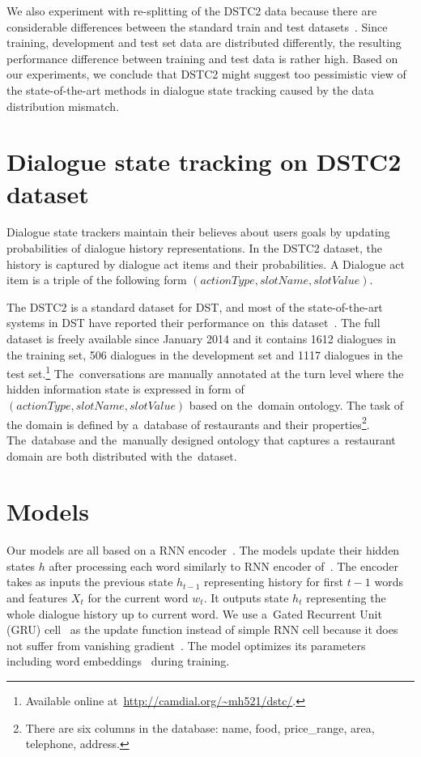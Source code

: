 \documentclass{itatnew}
\begin{document}
We also experiment with re-splitting of the DSTC2 data because there are considerable differences between the standard train and test datasets~\cite{henderson2014second}.
Since training, development and test set data are distributed differently, the resulting performance difference between training and test data is rather high.
Based on our experiments, we conclude that DSTC2 might suggest too pessimistic view of the state-of-the-art methods in dialogue state tracking caused by the data distribution mismatch.


\section{Dialogue state tracking on DSTC2 dataset}\label{sec:dst}
Dialogue state trackers maintain their believes about users goals by updating probabilities of dialogue history representations.
In the DSTC2 dataset, the history is captured by dialogue act items and their probabilities.
A Dialogue act item is a triple of the following form $(actionType, slotName, slotValue)$.

The DSTC2 is a standard dataset for DST, and most of the state-of-the-art systems in DST have reported their performance on~this dataset~\cite{henderson2014second}. 
The full dataset is freely available since January 2014 and it contains 1612 dialogues in the training set, 506 dialogues in the development set and 1117 dialogues in the test set.\footnote{Available online at~\url{http://camdial.org/~mh521/dstc/}.}
The~conversations are manually annotated at the turn level where the hidden information state is expressed in form of $(actionType, slotName, slotValue)$ based on the~domain ontology.
The task of the domain is defined by a~database of restaurants and their properties\footnote{There are six columns in the database: name, food, price\_range, area, telephone, address.}.
The~database and the~manually designed ontology that captures a~restaurant domain are both distributed with the~dataset.

\section{Models}\label{sec:model}
Our models are all based on a RNN encoder~\cite{werbos1990backpropagation}. 
The models update their hidden states $h$ after processing each word similarly to RNN encoder of~\citet{zilka2015incremental}.
The encoder takes as inputs the previous state $h_{t-1}$ representing history for first $t-1$ words and features $X_t$ for the current word $w_t$. 
It outputs state $h_t$ representing the whole dialogue history up to current word.
We use a~Gated Recurrent Unit (GRU) cell~\cite{cho2014gru} as the update function instead of simple RNN cell because it does not suffer from vanishing gradient~\cite{hochreiter2001gradient}.
The model optimizes its parameters including word embeddings~\cite{bengio2003neural} during training.
\end{document}
